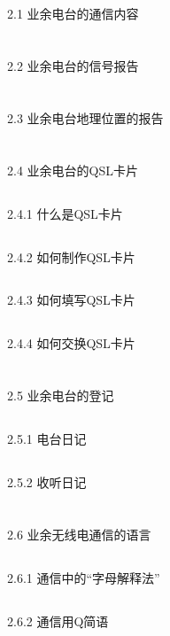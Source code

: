 \documentclass[12pt,UTF8]{ctexbook}
\begin{document}
\section{}2.1 业余电台的通信内容
\section{}2.2 业余电台的信号报告
\section{}2.3 业余电台地理位置的报告
\section{}2.4 业余电台的QSL卡片
\subsection{}2.4.1 什么是QSL卡片
\subsection{}2.4.2 如何制作QSL卡片
\subsection{}2.4.3 如何填写QSL卡片
\subsection{}2.4.4 如何交换QSL卡片
\section{}2.5 业余电台的登记
\subsection{}2.5.1 电台日记
\subsection{}2.5.2 收听日记
\section{}2.6 业余无线电通信的语言
\subsection{}2.6.1 通信中的“字母解释法”
\subsection{}2.6.2 通信用Q简语
\end{document}
